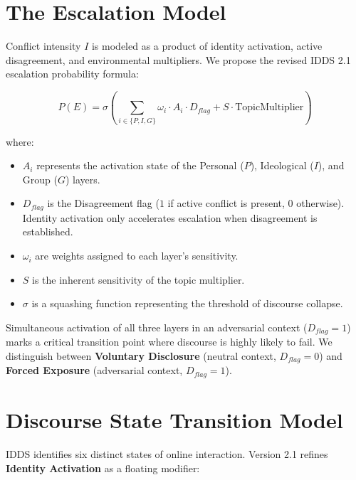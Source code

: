 \documentclass[11pt,a4paper]{article}
\begin{document}
\section{The Escalation Model}
Conflict intensity $I$ is modeled as a product of identity activation, active disagreement, and environmental multipliers. We propose the revised IDDS 2.1 escalation probability formula:

\begin{equation}
    P(E) = \sigma \left( \sum_{i \in \{P, I, G\}} \omega_i \cdot A_i \cdot D_{flag} + S \cdot \text{TopicMultiplier} \right)
\end{equation}

where:
\begin{itemize}
    \item $A_i$ represents the activation state of the Personal ($P$), Ideological ($I$), and Group ($G$) layers.
    \item $D_{flag}$ is the Disagreement flag ($1$ if active conflict is present, $0$ otherwise). Identity activation only accelerates escalation when disagreement is established.
    \item $\omega_i$ are weights assigned to each layer's sensitivity.
    \item $S$ is the inherent sensitivity of the topic multiplier.
    \item $\sigma$ is a squashing function representing the threshold of discourse collapse.
\end{itemize}

Simultaneous activation of all three layers in an adversarial context ($D_{flag} = 1$) marks a critical transition point where discourse is highly likely to fail. We distinguish between \textbf{Voluntary Disclosure} (neutral context, $D_{flag} = 0$) and \textbf{Forced Exposure} (adversarial context, $D_{flag} = 1$). 

\section{Discourse State Transition Model}
IDDS identifies six distinct states of online interaction. Version 2.1 refines \textbf{Identity Activation} as a floating modifier:
\end{document}
